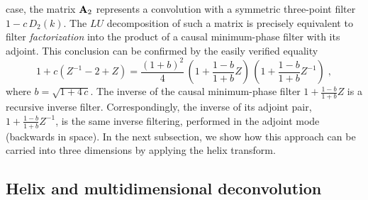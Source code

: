 case, the matrix $\bold{A}_2$ represents a convolution with a
symmetric three-point filter $1-c\,D_2(k)$. The $LU$
decomposition of such a matrix is precisely equivalent to filter
\emph{factorization} into the product of a causal minimum-phase filter
with its adjoint. This conclusion can be confirmed by the easily
verified equality
\begin{equation}\label{eqn:d2d1}
  1 + c (Z^{-1} - 2 + Z) = \frac{(1+b)^2}{4}\, \left(1 + \frac{1-b}{1+b} Z\right)
  \,\left(1 + \frac{1-b}{1+b} Z^{-1}\right)\;,
\end{equation}
where $b = \sqrt{1+ 4\,c}$. The inverse of the causal minimum-phase
filter $1 + \frac{1-b}{1+b} Z$ is a recursive inverse filter.
Correspondingly, the inverse of its adjoint pair, $1 + \frac{1-b}{1+b}
Z^{-1}$, is the same inverse filtering, performed in the adjoint mode
(backwards in space).  In the next subsection, we show how this
approach can be carried into three dimensions by applying the helix
transform.

\subsection{Helix and multidimensional deconvolution}

